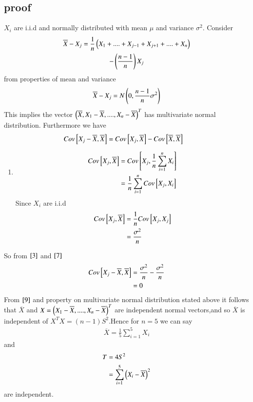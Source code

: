 \documentclass[journal,12pt,twocolumn]{IEEEtran}
\begin{document}
\subsection{proof}
$X_i$ are i.i.d and normally distributed with mean $\mu$ and variance $\sigma^2$. Consider
\begin{multline}
    \overline{X}-X_j=\frac{1}{n}\left(X_1+....+X_{j-1}+X_{j+1}+....+X_n\right)\\
    -\left(\frac{n-1}{n}\right)X_j
\end{multline}
from properties of mean and variance
\begin{align}
  \overline{X}-X_j  =N\left(0,\frac{n-1}{n}\sigma^2\right)
\end{align}
This implies the vector $\left(\overline{X},X_1-\overline{X},....,X_n-\overline{X}\right)^T$ has multivariate normal distribution.
Furthermore we have
\begin{align}
    Cov{}\left[X_j-\overline{X},\overline{X}\right]&=Cov{}\left[X_j,\overline{X}\right]-Cov{}\left[\overline{X},\overline{X}\right]
    \label{3}
\end{align}
\begin{enumerate}
    \item
    \begin{align}
        Cov{}\left[X_j,\overline{X}\right]&=Cov{}\left[X_j,\frac{1}{n}\sum_{i=1}^n X_i\right]\\
       &= \frac{1}{n}\sum_{i=1}^n Cov{}\left[X_j,X_i\right]
    \end{align}
Since $X_i$ are i.i.d
    \begin{align}
       Cov{}\left[X_j,\overline{X}\right]&=\frac{1}{n}Cov{}\left[X_j,X_j\right]\\ 
       &=\frac{\sigma^2}{n}\label{7}
    \end{align}
\end{enumerate}
So from $\eqref{3}$ and $\eqref{7}$
\begin{align}
    Cov{}\left[X_j-\overline{X},\overline{X}\right]&=\frac{\sigma^2}{n}-\frac{\sigma^2}{n}\\
    &=0\label{9}
\end{align}
From $\eqref{9}$ and property on multivariate normal distribution stated above it follows that $\overline{X}$ and $X=\left(X_1-\overline{X},....,X_n-\overline{X}\right)^T$ are independent normal vectors,and so $\overline{X}$ is independent of $X^TX=(n-1)S^2$.Hence for $n=5$ we can say 
\begin{align}
    \overline{X}=\frac{1}{5}\sum_{i=1}^{5}X_i
\end{align}
and
\begin{align}
    T&=4S^2\\
    &=\sum_{i=1}^{5}\left(X_i-\overline{X}\right)^2
\end{align}
are independent.
\end{document}
